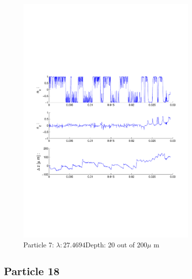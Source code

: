 \begin{figure}[ H]

\caption{Particle 7: $ \lambda: 27.4694$Depth: 20 out of $200 \mu $ m}

\centering

\includegraphics[width=0.8\textwidth]{Images/Particle 7/Particle7.pdf}

\end{figure}


\subsection{Particle 18}

